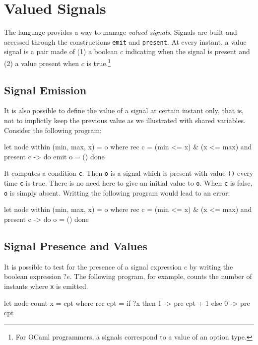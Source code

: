\documentclass[11pt,titlepage,twoside]{report}
\newcommand{\ocaml}{{\sf OCaml}}
\begin{document}
\section{Valued Signals\label{signals}} %

The language provides a way to manage {\em valued signals}. Signals
are built and accessed through the constructions \verb-emit- and
\verb-present-.  At every instant, a value signal is a pair made of (1) a boolean
$c$ indicating when the signal is present and (2) a value present when $c$ is
true.\footnote{For \ocaml{} programmers, a signals correspond to a value
of an option type.}
 
\subsection{Signal Emission\label{emit}} %

It is also possible to define the value of a signal at certain instant only,
that is, not to implictly keep the previous value as we illustrated with
shared variables. %
Consider the following program:
\begin{chklisting}[withresult]
let node within (min, max, x) = o where
  rec c = (min <= x) & (x <= max)
  and present c -> do emit o = () done
\end{chklisting}
It computes a condition \verb-c-. Then \verb-o- is a signal
which is present with value \verb-()- every time \verb-c- is
true. There is no need here to give an initial value to \verb-o-. When \verb-c- is
false, \verb-o- is simply absent. Writting the following program would lead to
an error:
\begin{chklisting}
let node within (min, max, x) = o where
  rec c = (min <= x) & (x <= max)
  and present c -> do o = () done
\end{chklisting}

\subsection{Signal Presence and Values\label{signalpresence}} %

It is possible to test for the presence of a signal expression $e$ by
writing the boolean expression $? e$. The following program, for
example, counts the number of instants where \verb-x- is emitted.
\begin{chklisting}[withresult]
let node count x = cpt where
  rec cpt = if ?x then 1 -> pre cpt + 1 else 0 -> pre cpt
\end{chklisting}
\end{document}
